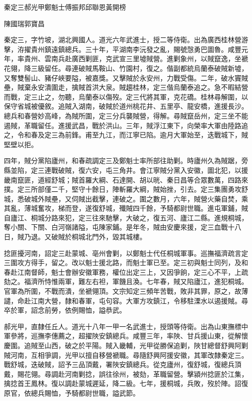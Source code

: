 
\begin{pinyinscope}
秦定三郝光甲鄭魁士傅振邦邱聯恩黃開榜

陳國瑞郭寶昌

秦定三，字竹坡，湖北興國人。道光六年武進士，授二等侍衛。出為廣西桂林營游擊，洊擢貴州鎮遠鎮總兵。三十年，平湖南李沅發之亂，賜號愨勇巴圖魯。咸豐元年，率貴州、雲南兵赴廣西剿匪，克武宣三里墟賊營。進剿象州，以賊竄逸，坐褫花翎，降三級留任。尋連破賊馬鞍山、竹園村，復之。偕副都統烏蘭泰破賊新墟，又奪雙髻山、豬仔峽要隘，被嘉獎。又擊賊於永安州，力戰受傷。二年，破水竇賊壘，賊棄永安潰圍走，擒賊首洪大泉。賊趨桂林，定三偕烏蘭泰追之。急不暇結營而戰，定三止之，勿聽，烏蘭泰以傷歿。定三代將其軍，克花礄。桂林尋解圍，以保守省城被優敘。追賊入湖南，破賊於道州桃花井、五里亭、龍安橋，進援長沙。總兵和春營妙高峰，為賊所圍，定三分兵襲賊營，得解。尋賊竄岳州，定三坐不能遏賊，革職留任。進援武昌，戰於洪山。三年，賊浮江東下，向榮率大軍由陸路追之，令和春及定三為前鋒。甫至九江，而江寧已陷。逾月大軍始至，迭戰城下，賊堅壁以拒。

四年，賊分黨陷廬州，和春疏調定三及鄭魁士率所部往助剿。時廬州久為賊踞，旁縣並陷，定三連戰破賊，復六安，屯三角井。會江寧賊分黨入安徽，圖北犯，以援畿南竄匪，道經舒城；賊首羅大綱、石達開、胡以晄、秦日昌等合眾數萬，四路來撲。定三所部僅二千，堅守十餘日，陣斬羅大綱，賊始挫，引去。定三集團勇攻舒城，悉破城外賊壘，又伺賊出截擊，連破之。圍之數月，六年，賊營火藥自焚，乘其亂，薄城奮攻，梯而登，遂復舒城，殲賊四千餘，予騎都尉世職。進屯軍鋪，賊自廬江、桐城分路來犯，定三往來馳擊，大破之，復五河、廬江二縣。進規桐城，奪小關、下關、白河嶺諸隘，屯陳家鋪。是年冬，賊由安慶來援，定三血戰十八日，賊乃退。又破賊於桐城北門外，毀其城樓。

捻匪擾河南，詔定三赴蒙城、亳州會剿，以鄭魁士代任桐城軍事。巡撫福濟疏言定三圍攻方得手，留之。改以魁士援北路，而魁士軍已至。定三初與魁士同列，及和春赴江南督師，魁士會辦安徽軍務，權位出定三上，又因爭餉，定三心不平，上疏劾之。福濟所恃惟兩軍，難左右袒，軍饑且渙。七年春，賊又陷廬江，進犯桐城。官軍為所圍，不戰而潰，坐褫翎頂。文宗知定三頻年苦戰，敗非其罪，原之，故薄譴，命赴江南大營，隸和春軍，屯句容。大軍方攻鎮江，令移駐溧水以遏援賊。尋卒於軍，詔念前勞，依例賜恤，謚恭武。

郝光甲，直隸任丘人。道光十八年一甲一名武進士，授頭等侍衛。出為山東撫標中軍參將，巡撫李僡薦之，超擢陜安鎮總兵。咸豐三年，率陜、甘兵援山東，從解懷慶圍。追賊至山西，破之於平陽。賊入畿輔，光甲從勝保追剿，陜甘總督舒興阿剿賊河南，互相爭調，光甲以擅自移營褫職。尋隨舒興阿援安徽，其軍改隸秦定三。戰舒城，迭破賊，詔予三品頂戴，署陜安鎮總兵。從克廬州，復舒城，復總兵頂戴，賜花翎。尋調赴河南剿捻，誤往徐州，被劾，革職留營。擊潁州捻匪於江集，擒捻首王鳳林。復以調赴蒙城遲延，降二級。七年，援桐城，兵敗，歿於陣。詔復原官，依總兵賜恤，予騎都尉世職，謚武節。


\end{pinyinscope}
